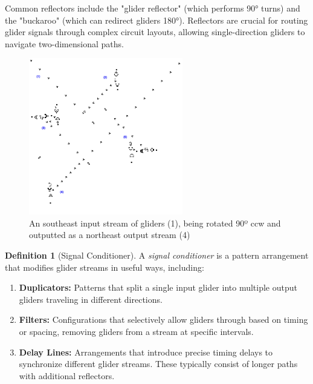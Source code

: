 \documentclass{article}
\theoremstyle{definition}
\newtheorem{definition}{Definition}[section]
\theoremstyle{plain}
\theoremstyle{plain}
\begin{document}
Common reflectors include the "glider reflector" (which performs 90° turns) and the "buckaroo" (which can redirect gliders 180°). Reflectors are crucial for routing glider signals through complex circuit layouts, allowing single-direction gliders to navigate two-dimensional paths.

\begin{figure}[H]
  \centering
  \includegraphics[width=0.6\textwidth]{figures/rotator.png} %
  \caption{An southeast input stream of gliders (1), being rotated 90º ccw and outputted as a northeast output stream (4) \cite{Carlini_2020}}
  \label{fig:rotator}
\end{figure}

\begin{definition}[Signal Conditioner]
A \textit{signal conditioner} is a pattern arrangement that modifies glider streams in useful ways, including:
\begin{enumerate}
  \item \textbf{Duplicators:} Patterns that split a single input glider into multiple output gliders traveling in different directions.
  \item \textbf{Filters:} Configurations that selectively allow gliders through based on timing or spacing, removing gliders from a stream at specific intervals.
  \item \textbf{Delay Lines:} Arrangements that introduce precise timing delays to synchronize different glider streams. These typically consist of longer paths with additional reflectors.
\end{enumerate}
\end{definition}
\end{document}
